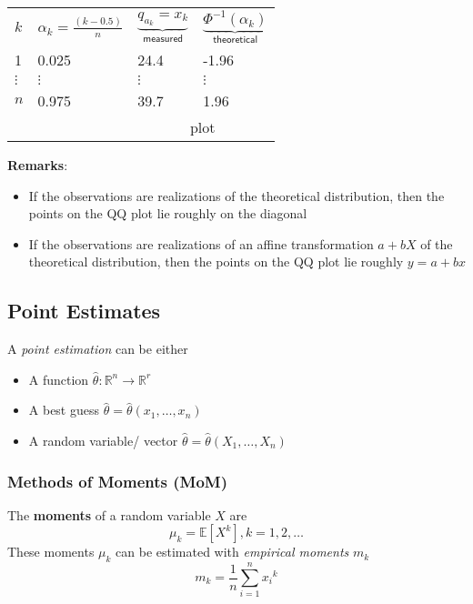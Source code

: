 \renewcommand{\arraystretch}{1.3}
\setlength{\oldtabcolsep}{\tabcolsep}\setlength\tabcolsep{12pt}
\begin{tabularx}{\linewidth}{@{}llll@{}}
    $k$      & $\alpha_k = \frac{(k-0.5)}{n}$ & $\underbrace{q_{a_k} = x_k}_{\textsf{measured}}$ & $\underbrace{\Phi^{-1}(\alpha_k)}_{\textsf{theoretical}}$ \\
    \cmidrule{2-4}
    1        & 0.025                          & 24.4                                             & -1.96                                                     \\
    $\vdots$ & $\vdots$                       & $\vdots$                                         & $\vdots$                                                  \\
    $n$      & 0.975                          & 39.7                                             & 1.96                                                      \\
    \cmidrule{3-4}
             &                                & \multicolumn{2}{c}{plot}
\end{tabularx}
\renewcommand{\arraystretch}{1}
\setlength\tabcolsep{\oldtabcolsep}

\textbf{Remarks}:
\begin{itemize}
    \item If the observations are realizations of the theoretical distribution, then the points on the QQ plot lie roughly on the diagonal
    \item If the observations are realizations of an affine transformation $a+bX$ of the theoretical distribution, then the points on the QQ plot lie roughly $y = a+bx$
\end{itemize}

\subsection{Point Estimates}
A \textit{point estimation} can be either
\begin{itemize}
    \item A function $\hat{\theta}: \mathbb{R}^n\to \mathbb{R}^r$
    \item A best guess $\hat{\theta} = \hat{\theta}(x_1,\ldots, x_n)$
    \item A random variable/ vector $\hat{\theta} = \hat{\theta}(X_1,\ldots, X_n)$
\end{itemize}

\subsubsection{Methods of Moments (MoM)}
The \textbf{moments} of a random variable $X$ are
\noindent\begin{equation*}
    \mu_k=\mathbb{E}[X^k],k=1,2,\ldots
\end{equation*}
These moments $\mu_k$ can be estimated with \textit{empirical moments} $m_k$
\noindent\begin{equation*}
    m_k=\frac{1}{n}\sum_{i=1}^n {x_i}^k
\end{equation*}

